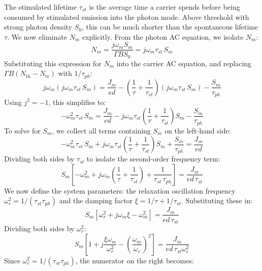 The stimulated lifetime $\tau_{st}$ is the average time a carrier spends before being consumed by stimulated emission into the photon mode. Above threshold with strong photon density $S_0$, this can be much shorter than the spontaneous lifetime $\tau$. We now eliminate $N_m$ explicitly. From the photon AC equation, we isolate $N_m$:
\begin{equation*}
    N_m = \frac{j\omega_m S_m}{\Gamma B S_0} = j\omega_m\tau_{st}\,S_m
\end{equation*}
Substituting this expression for $N_m$ into the carrier AC equation, and replacing $\Gamma B(N_\text{th} - N_\text{tr})$ with $1/\tau_{ph}$:
\begin{equation*}
    j\omega_m(j\omega_m\tau_{st}\,S_m) = \frac{J_m}{ed} - \left(\frac{1}{\tau} + \frac{1}{\tau_{st}}\right)(j\omega_m\tau_{st}\,S_m) - \frac{S_m}{\tau_{ph}}
\end{equation*}
Using $j^2 = -1$, this simplifies to:
\begin{equation*}
    -\omega_m^2\tau_{st}\,S_m = \frac{J_m}{ed} - j\omega_m\tau_{st}\left(\frac{1}{\tau} + \frac{1}{\tau_{st}}\right)S_m - \frac{S_m}{\tau_{ph}}
\end{equation*}
To solve for $S_m$, we collect all terms containing $S_m$ on the left-hand side:
\begin{equation*}
    -\omega_m^2\tau_{st}\,S_m + j\omega_m\tau_{st}\left(\frac{1}{\tau} + \frac{1}{\tau_{st}}\right)S_m + \frac{S_m}{\tau_{ph}} = \frac{J_m}{ed}
\end{equation*}
Dividing both sides by $\tau_{st}$ to isolate the second-order frequency term:
\begin{equation*}
    S_m\left[ -\omega_m^2 + j\omega_m\left(\frac{1}{\tau} + \frac{1}{\tau_{st}}\right) + \frac{1}{\tau_{st}\,\tau_{ph}} \right] = \frac{J_m}{ed\,\tau_{st}}
\end{equation*}
We now define the system parameters: the relaxation oscillation frequency $\omega_r^2 = 1/(\tau_{st}\tau_{ph})$ and the damping factor $\xi = 1/\tau + 1/\tau_{st}$. Substituting these in:
\begin{equation*}
    S_m\left[ \omega_r^2 + j\omega_m\xi - \omega_m^2 \right] = \frac{J_m}{ed\,\tau_{st}}
\end{equation*}
Dividing both sides by $\omega_r^2$:
\begin{equation*}
    S_m\left[ 1 + j\frac{\xi\omega_m}{\omega_r^2} - \left(\frac{\omega_m}{\omega_r}\right)^2 \right] = \frac{J_m}{ed\,\tau_{st}\omega_r^2}
\end{equation*}
Since $\omega_r^2 = 1/(\tau_{st}\tau_{ph})$, the numerator on the right becomes:
